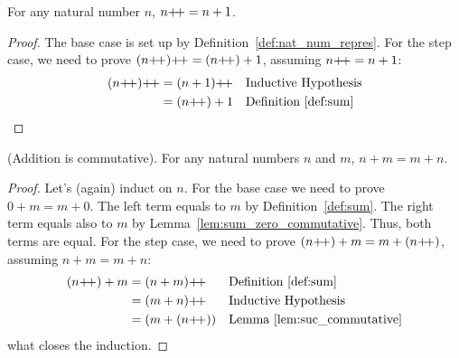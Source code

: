 \begin{subsequence}
    \begin{corollary}
    For any natural number $n$, $n\operatorname{\!+\!+} = n+1$.\label{cor:nnext=n+1}
    \end{corollary}    
\end{subsequence}

\begin{proof}
    The base case is set up by Definition~\ref{def:nat_num_repres}. For the step case, we need to prove $(n\operatorname{\!+\!+})\operatorname{\!+\!+} = (n\operatorname{\!+\!+})+1$, assuming $n\operatorname{\!+\!+}=n+1$:
    \begin{align*}
        (n\next)\next &= (n+1)\next && \text{Inductive Hypothesis}\\
        &= (n\next)+1 && \text{Definition~\ref{def:sum}}
    \end{align*}
\end{proof}

\begin{proposition}
    \textup{(Addition is commutative)}. For any natural numbers $n$ and $m$, $n+m=m+n$.\label{prop:sum_commutative}
\end{proposition}
\begin{proof}
    Let's (again) induct on $n$. For the base case we need to prove $0+m=m+0$. The left term equals to $m$ by Definition~\ref{def:sum}. The right term equals also to $m$ by Lemma~\ref{lem:sum_zero_commutative}. Thus, both terms are equal. 
    For the step case, we need to prove $(n\operatorname{\!+\!+})+m=m+(n\operatorname{\!+\!+})$, assuming $n+m=m+n$:
    \begin{align*}
        (n\next)+m &= (n+m)\next && \text{Definition~\ref{def:sum}}\\
        &=(m+n)\next && \text{Inductive Hypothesis}\\
        &=(m+(n\next)) && \text{Lemma~\ref{lem:suc_commutative}}
    \end{align*}
    what closes the induction.
\end{proof}

